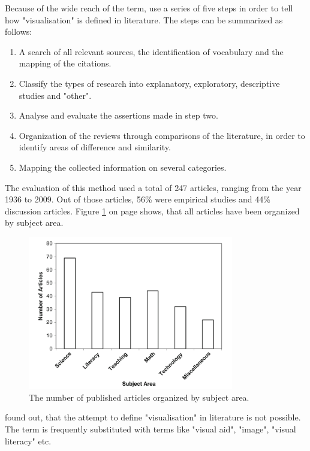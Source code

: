 Because of the wide reach of the term, \citeauthor{Phillips2010} use a series of five steps in order to tell how "visualisation" is defined in literature. The steps can be summarized as follows:
\begin{enumerate}
\item A search of all relevant sources, the identification of vocabulary and the mapping of the citations.
\item Classify the types of research into explanatory, exploratory, descriptive studies and "other".
\item Analyse and evaluate the assertions made in step two.
\item Organization of the reviews through comparisons of the literature, in order to identify areas of difference and similarity.
\item Mapping the collected information on several categories.
\end{enumerate}
The evaluation of this method used a total of 247 articles, ranging from the year 1936 to 2009. Out of those articles, 56\% were empirical studies and 44\% discussion articles. Figure \ref{fig:evaluation-definition} on page \pageref{fig:evaluation-definition} shows, that all articles have been organized by subject area.

\begin{figure}[!htb]
\centering
\includegraphics[width=0.8\textwidth,keepaspectratio]{images/definition/evaluation-definition.png}
\caption[
    The number of published articles organized by subject area .
]{The number of published articles organized by subject area.}
\label{fig:evaluation-definition}
\end{figure}

\citeauthor{Phillips2010} found out, that the attempt to define "visualisation" in literature is not possible. The term is frequently substituted with terms like "visual aid", "image", "visual literacy" etc.

